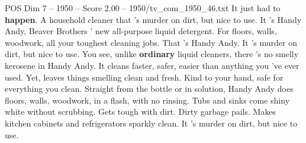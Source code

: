 \begin{textsample}{POS Dim 7 – 1950 – Score 2.00 – 1950/tv\_com\_1950\_46.txt}  \label{ex:f7_pos_015}
It just had to \textbf{happen}.
A household cleaner that 's murder on dirt, but nice to use.
It 's Handy Andy, Beaver Brothers ' new all-purpose liquid detergent.
For floors, walls, woodwork, all your toughest cleaning jobs.
That 's Handy Andy.
It 's murder on dirt, but nice to use.
You see, unlike \textbf{ordinary} liquid cleaners, there 's no smelly kerosene in Handy Andy.
It cleans faster, safer, easier than anything you 've ever used.
Yet, leaves things smelling clean and fresh.
Kind to your hand, safe for everything you clean.
Straight from the bottle or in solution, Handy Andy does floors, walls, woodwork, in a flash, with no rinsing.
Tubs and sinks come shiny white without scrubbing.
Gets tough with dirt.
Dirty garbage pails.
Makes kitchen cabinets and refrigerators sparkly clean.
It 's murder on dirt, but nice to use.

\end{textsample}
